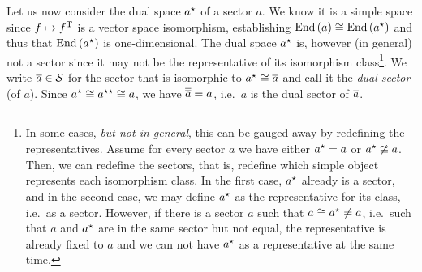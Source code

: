 Let us now consider the dual space $a^\star$ of a sector $a$.
%
We know it is a simple space since $f \mapsto f^{\text{T}}$ is a vector space isomorphism, establishing $\mathrm{End}\left(a\right) \cong \mathrm{End}\left(a^\star\right)$ and thus that $\mathrm{End}\left(a^\star\right)$ is one-dimensional.
%
The dual space $a^\star$ is, however (in general) not a sector since it may not be the representative of its isomorphism class\footnote{
    In some cases, \emph{but not in general}, this can be gauged away by redefining the representatives.
    Assume for every sector $a$ we have either $a^\star = a$ or $a^\star \ncong a$.
    Then, we can redefine the sectors, that is, redefine which simple object represents each isomorphism class.
    In the first case, $a^\star$ already is a sector, and in the second case, we may define $a^\star$ as the representative for its class, i.e.~as a sector.
    However, if there is a sector $a$ such that $a \cong a^\star \neq a$, i.e.~such that $a$ and $a^\star$ are in the same sector but not equal, the representative is already fixed to $a$ and we can not have $a^\star$ as a representative at the same time.
}.
We write $\overline{a} \in \mathcal{S}$ for the sector that is isomorphic to $a^\star \cong \overline{a}$ and call it the \emph{dual sector} (of $a$).
%
Since $\overline{a}^\star \cong a^{\star\star} \cong a$, we have $\overline{\overline{a}} = a$, i.e.~$a$ is the dual sector of $\overline{a}$.

